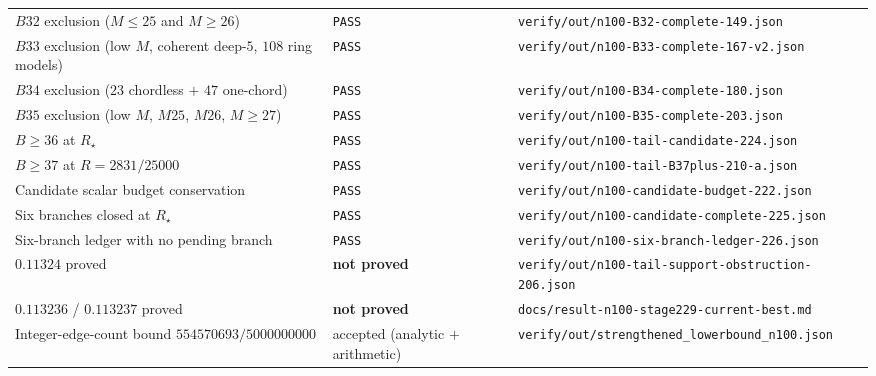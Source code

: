 {\begin{longtable}{@{}@{}>{\raggedright\arraybackslash}p{}>{\raggedright\arraybackslash}p{}>{\raggedright\arraybackslash}p{}@{}}
$B32$ exclusion ($M\le25$ and $M\ge26$) & \texttt{PASS} &
\texttt{verify/\allowbreak{}out/\allowbreak{}n100-\allowbreak{}B32-\allowbreak{}complete-\allowbreak{}149.json} \\
$B33$ exclusion (low $M$, coherent deep-$5$, $108$ ring models) & \texttt{PASS} &
\texttt{verify/\allowbreak{}out/\allowbreak{}n100-\allowbreak{}B33-\allowbreak{}complete-\allowbreak{}167-\allowbreak{}v2.json} \\
$B34$ exclusion ($23$ chordless $+$ $47$ one-chord) & \texttt{PASS} &
\texttt{verify/\allowbreak{}out/\allowbreak{}n100-\allowbreak{}B34-\allowbreak{}complete-\allowbreak{}180.json} \\
$B35$ exclusion (low $M$, $M25$, $M26$, $M\ge27$) & \texttt{PASS} &
\texttt{verify/\allowbreak{}out/\allowbreak{}n100-\allowbreak{}B35-\allowbreak{}complete-\allowbreak{}203.json} \\
$B\ge36$ at $R_\star$ & \texttt{PASS} & \texttt{verify/\allowbreak{}out/\allowbreak{}n100-\allowbreak{}tail-\allowbreak{}candidate-\allowbreak{}224.json} \\
$B\ge37$ at $R=2831/25000$ & \texttt{PASS} &
\texttt{verify/\allowbreak{}out/\allowbreak{}n100-\allowbreak{}tail-\allowbreak{}B37plus-\allowbreak{}210-\allowbreak{}a.json} \\
Candidate scalar budget conservation & \texttt{PASS} &
\texttt{verify/\allowbreak{}out/\allowbreak{}n100-\allowbreak{}candidate-\allowbreak{}budget-\allowbreak{}222.json} \\
Six branches closed at $R_\star$ & \texttt{PASS} &
\texttt{verify/\allowbreak{}out/\allowbreak{}n100-\allowbreak{}candidate-\allowbreak{}complete-\allowbreak{}225.json} \\
Six-branch ledger with no pending branch & \texttt{PASS} &
\texttt{verify/\allowbreak{}out/\allowbreak{}n100-\allowbreak{}six-\allowbreak{}branch-\allowbreak{}ledger-\allowbreak{}226.json} \\
$0.11324$ proved & \textbf{not proved} &
{\footnotesize\texttt{verify/\allowbreak{}out/\allowbreak{}n100-\allowbreak{}tail-\allowbreak{}support-\allowbreak{}obstruction-\allowbreak{}206.json}} \\
$0.113236$ / $0.113237$ proved & \textbf{not proved} &
{\footnotesize\texttt{docs/\allowbreak{}result-\allowbreak{}n100-\allowbreak{}stage229-\allowbreak{}current-\allowbreak{}best.md}} \\
Integer-edge-count bound $554570693/5000000000$ & accepted (analytic $+$ arithmetic) &
{\footnotesize\texttt{verify/\allowbreak{}out/\allowbreak{}strengthened\_\allowbreak{}lowerbound\_\allowbreak{}n100.json}} \\

\end{longtable}}
